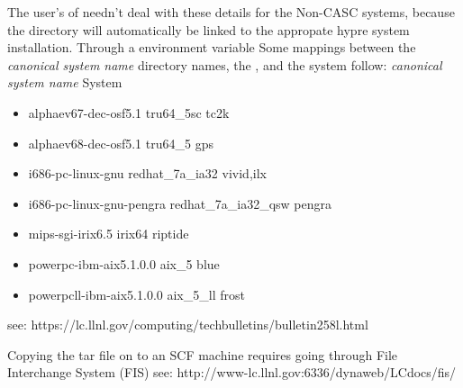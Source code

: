 \begin{enumerate}
   The user's of \hypre{} needn't deal with these details for the 
   Non-CASC systems, because the  directory
   will automatically be linked to the appropate hypre system 
   installation. Through a  environment variable
   Some mappings between the  
   \textit{canonical system name} directory names, the
   , and the system  follow:
 \textit{canonical system name}     System
   \begin{itemize}
   \item  alphaev67-dec-osf5.1        tru64\_5sc           tc2k
   \item  alphaev68-dec-osf5.1        tru64\_5             gps
   \item  i686-pc-linux-gnu           redhat\_7a\_ia32      vivid,ilx
   \item  i686-pc-linux-gnu-pengra    redhat\_7a\_ia32\_qsw  pengra
   \item  mips-sgi-irix6.5            irix64              riptide
   \item  powerpc-ibm-aix5.1.0.0      aix\_5               blue
   \item  powerpcll-ibm-aix5.1.0.0    aix\_5\_ll            frost
   \end{itemize}

   see: https://lc.llnl.gov/computing/techbulletins/bulletin258l.html

   Copying the tar file on to an SCF machine requires going through
   File Interchange System (FIS) see: 
   http://www-lc.llnl.gov:6336/dynaweb/LCdocs/fis/


\end{enumerate}
